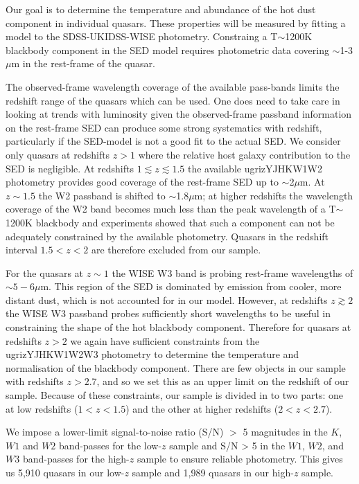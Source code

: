 Our goal is to determine the temperature and abundance of the hot dust component in individual quasars.  
These properties will be measured by fitting a model to the SDSS-UKIDSS-WISE photometry. 
Constraing a T$\sim$1200K blackbody component in the SED model requires photometric data covering $\sim$1-3$\mu$m in the rest-frame of the quasar. 

The observed-frame wavelength coverage of the available pass-bands limits the redshift range of the quasars which can be used. 
One does need to take care in looking at trends with luminosity given the observed-frame passband information on the rest-frame SED can produce some strong systematics with redshift, particularly if the SED-model is not a good fit to the actual SED. 
We consider only quasars at redshifts $z>1$ where the relative host galaxy contribution to the SED is negligible. 
At redshifts $1 \lesssim z \lesssim 1.5$ the available ugrizYJHKW1W2 photometry provides good coverage of the rest-frame SED up to $\sim$2$\mu$m.
At $z\sim1.5$ the W2 passband is shifted to $\sim$1.8$\mu$m; at higher redshifts the wavelength coverage of the W2 band becomes much less than the peak wavelength of a T$\sim$1200K blackbody and experiments showed that such a component can not be adequately constrained by the available photometry. 
Quasars in the redshift interval $1.5 < z < 2$ are therefore excluded from our sample. 

For the quasars at $z \sim 1$ the WISE W3 band is probing rest-frame wavelengths of $\sim5-6\mu$m. 
This region of the SED is dominated by emission from cooler, more distant dust, which is not accounted for in our model.
However, at redshifts $z \gtrsim 2$ the WISE W3 passband probes sufficiently short wavelengths to be useful in constraining the shape of the hot blackbody component. 
Therefore for quasars at redshifts $z > 2$ we again have sufficient constraints from the ugrizYJHKW1W2W3 photometry to determine the temperature and normalisation of the blackbody component. 
There are few objects in our sample with redshifts $z > 2.7$, and so we set this as an upper limit on the redshift of our sample. 
Because of these constraints, our sample is divided in to two parts: one at low redshifts ($1 < z < 1.5$) and the other at higher redshifts ($2 < z < 2.7$). 

We impose a lower-limit signal-to-noise ratio (S/N) $>$ 5 magnitudes in the $K$, $W1$ and $W2$ band-passes for the low-$z$ sample and S/N > 5 in the $W1$, $W2$, and $W3$ band-passes for the high-$z$ sample to ensure reliable photometry.
This gives us 5,910 quasars in our low-$z$ sample and 1,989 quasars in our high-$z$ sample. 

